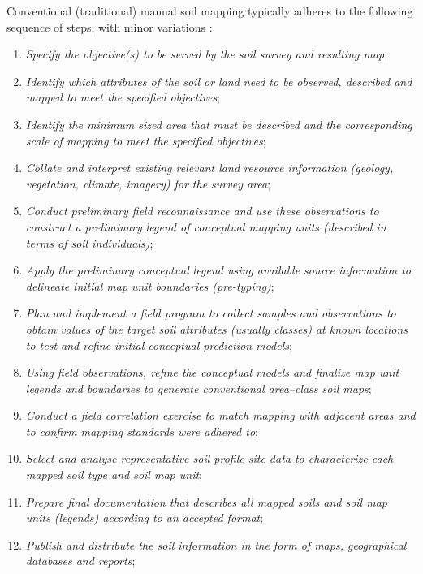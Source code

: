 \documentclass[graybox,natbib,nospthms,UStrade]{svmono}
\begin{document}
Conventional (traditional) manual soil mapping typically adheres to the
following sequence of steps, with minor variations
\citep{McBratney2003Geoderma}:

\begin{enumerate}
\def\labelenumi{\arabic{enumi}.}
\item
  \emph{Specify the objective(s) to be served by the soil survey and
  resulting map};
\item
  \emph{Identify which attributes of the soil or land need to be observed,
  described and mapped to meet the specified objectives};
\item
  \emph{Identify the minimum sized area that must be described and the
  corresponding scale of mapping to meet the specified objectives};
\item
  \emph{Collate and interpret existing relevant land resource information
  (geology, vegetation, climate, imagery) for the survey area};
\item
  \emph{Conduct preliminary field reconnaissance and use these observations
  to construct a preliminary legend of conceptual mapping units
  (described in terms of soil individuals)};
\item
  \emph{Apply the preliminary conceptual legend using available source
  information to delineate initial map unit boundaries (pre-typing)};
\item
  \emph{Plan and implement a field program to collect samples and
  observations to obtain values of the target soil attributes
  (usually classes) at known locations to test and refine initial
  conceptual prediction models};
\item
  \emph{Using field observations, refine the conceptual models and finalize
  map unit legends and boundaries to generate conventional area--class
  soil maps};
\item
  \emph{Conduct a field correlation exercise to match mapping with adjacent
  areas and to confirm mapping standards were adhered to};
\item
  \emph{Select and analyse representative soil profile site data to
  characterize each mapped soil type and soil map unit};
\item
  \emph{Prepare final documentation that describes all mapped soils and
  soil map units (legends) according to an accepted format};
\item
  \emph{Publish and distribute the soil information in the form of maps,
  geographical databases and reports};
\end{enumerate}
\end{document}
